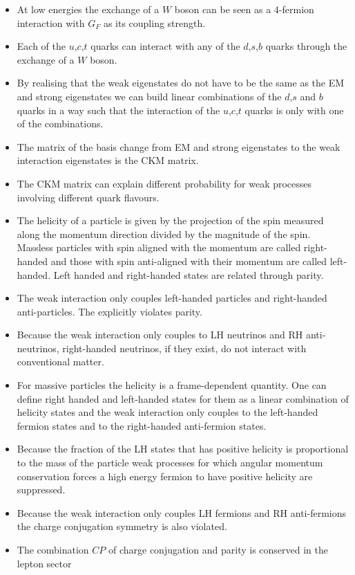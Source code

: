 \documentclass[12pt]{article}
\begin{document}
\begin{itemize}
\item At low energies the exchange of a $W$ boson can be seen as a $4$-fermion interaction with $G_F$ as its coupling strength.
\item Each of the $u$,$c$,$t$ quarks can interact with any of the $d$,$s$,$b$ quarks through the exchange of a $W$ boson.
\item By realising that the weak eigenstates do not have to be the same as the EM and strong eigenstates we can build linear combinations of the $d$,$s$ and $b$ quarks in a way such that the interaction of the $u$,$c$,$t$ quarks is only with one of the combinations.
\item The matrix of the basis change from EM and strong eigenstates to the weak interaction eigenstates is the CKM matrix.
\item The CKM matrix can explain different probability for weak processes involving different quark flavours.
\item The helicity of a particle is given by the projection of the spin measured along the momentum direction divided by the magnitude of the spin. Massless particles with spin aligned with the momentum are called right-handed and those with spin anti-aligned with their momentum are called left-handed. Left handed and right-handed states are related through parity.
\item The weak interaction only couples left-handed particles and right-handed anti-particles. The explicitly violates parity.
\item Because the weak interaction only couples to LH neutrinos and RH anti-neutrinos, right-handed neutrinos, if they exist, do not interact with conventional matter.
\item For massive particles the helicity is a frame-dependent quantity. One can define right handed and left-handed states for them as a linear combination of helicity states and the weak interaction only couples to the left-handed fermion states and to the right-handed anti-fermion states.
\item Because the fraction of the LH states that has positive helicity is proportional to the mass of the particle weak processes for which angular momentum conservation forces a high energy fermion to have positive helicity are suppressed.
\item Because the weak interaction only couples LH fermions and RH anti-fermions the charge conjugation symmetry is also violated.
\item The combination $CP$ of charge conjugation and parity is conserved in the lepton sector

\end{itemize}
\end{document}
